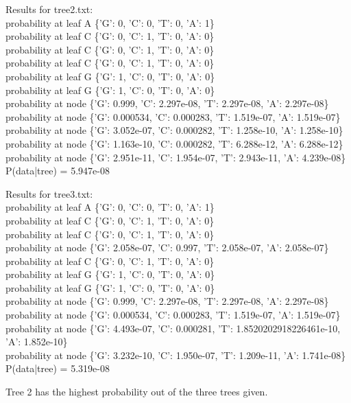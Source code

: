 \documentclass{acm_proc_article-sp}
\begin{document}
Results for tree2.txt:\\
probability at leaf A \{'G': 0, 'C': 0, 'T': 0, 'A': 1\} \\
probability at leaf C \{'G': 0, 'C': 1, 'T': 0, 'A': 0\}\\
probability at leaf C \{'G': 0, 'C': 1, 'T': 0, 'A': 0\}\\
probability at leaf C \{'G': 0, 'C': 1, 'T': 0, 'A': 0\}\\
probability at leaf G \{'G': 1, 'C': 0, 'T': 0, 'A': 0\}\\
probability at leaf G \{'G': 1, 'C': 0, 'T': 0, 'A': 0\}\\
probability at node \{'G': 0.999, 'C': 2.297e-08, 'T': 2.297e-08, 'A': 2.297e-08\}\\
probability at node \{'G': 0.000534, 'C': 0.000283, 'T': 1.519e-07, 'A': 1.519e-07\}\\
probability at node \{'G': 3.052e-07, 'C': 0.000282, 'T': 1.258e-10, 'A': 1.258e-10\}\\
probability at node \{'G': 1.163e-10, 'C': 0.000282, 'T': 6.288e-12, 'A': 6.288e-12\}\\
probability at node \{'G': 2.951e-11, 'C': 1.954e-07, 'T': 2.943e-11, 'A': 4.239e-08\}\\
P(data|tree) = 5.947e-08

Results for tree3.txt: \\
probability at leaf A \{'G': 0, 'C': 0, 'T': 0, 'A': 1\}\\
probability at leaf C \{'G': 0, 'C': 1, 'T': 0, 'A': 0\}\\
probability at leaf C \{'G': 0, 'C': 1, 'T': 0, 'A': 0\}\\
probability at node \{'G': 2.058e-07, 'C': 0.997, 'T': 2.058e-07, 'A': 2.058e-07\}\\
probability at leaf C \{'G': 0, 'C': 1, 'T': 0, 'A': 0\}\\
probability at leaf G \{'G': 1, 'C': 0, 'T': 0, 'A': 0\}\\
probability at leaf G \{'G': 1, 'C': 0, 'T': 0, 'A': 0\}\\
probability at node \{'G': 0.999, 'C': 2.297e-08, 'T': 2.297e-08, 'A': 2.297e-08\}\\
probability at node \{'G': 0.000534, 'C': 0.000283, 'T': 1.519e-07, 'A': 1.519e-07\}\\
probability at node \{'G': 4.493e-07, 'C': 0.000281, 'T': 1.8520202918226461e-10, 'A': 1.852e-10\}\\
probability at node \{'G': 3.232e-10, 'C': 1.950e-07, 'T': 1.209e-11, 'A': 1.741e-08\}\\
P(data|tree) = 5.319e-08

Tree 2 has the highest probability out of the three trees given.
%


%
%

\balancecolumns
\end{document}
